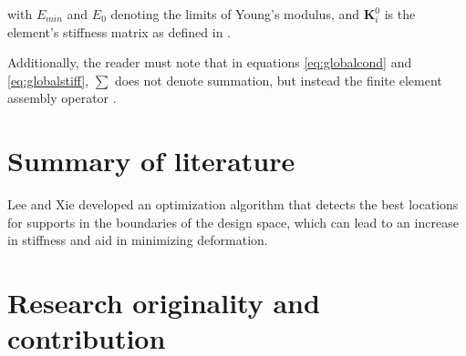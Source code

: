 \documentclass[../main.tex]{subfiles}
\begin{document}
with $E_{min}$ and $E_0$ denoting the limits of Young's modulus, and $\bm{K}_i^0$ is the element's stiffness matrix as defined in \cite{liuEfficient3DTopology2014}.

Additionally, the reader must note that in equations \ref{eq:globalcond} and \ref{eq:globalstiff}, $\sum$ does not denote summation, but instead the finite element assembly operator \cite{hornbergerFiniteElementMethod2005}. 

\section{Summary of literature}

Lee and Xie \cite{leeSimultaneouslyOptimizingSupports2021} developed an optimization algorithm that detects the best locations for supports in the boundaries of the design space, which can lead to an increase in stiffness and aid in minimizing deformation. 

\section{Research originality and contribution}
\end{document}
